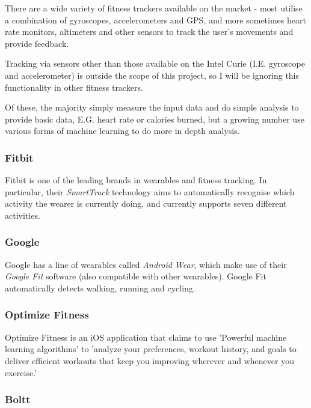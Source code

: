 \documentclass[a4paper]{article}
\begin{document}
There are a wide variety of fitness trackers available on the market - most utilise a combination of gyroscopes, accelerometers and GPS, and more sometimes heart rate monitors, altimeters and other sensors to track the user's movements and provide feedback.

Tracking via sensors other than those available on the Intel Curie (I.E. gyroscope and accelerometer) is outside the scope of this project, so I will be ignoring this functionality in other fitness trackers.

Of these, the majority simply measure the input data and do simple analysis to provide basic data, E.G. heart rate or calories burned, but a growing number use various forms of machine learning to do more in depth analysis. 

\subsubsection{Fitbit}

Fitbit is one of the leading brands in wearables and fitness tracking. In particular, their \textit{SmartTrack}\cite{bgref8} technology aims to automatically recognise which activity the wearer is currently doing, and currently supports seven different activities.

\subsubsection{Google}

Google has a line of wearables called \textit{Android Wear}\cite{bgref9}, which make use of their \textit{Google Fit}\cite{bgref10} software (also compatible with other wearables).
Google Fit automatically detects walking, running and cycling.

\subsubsection{Optimize Fitness}

Optimize Fitness\cite{bgref11} is an iOS application that claims to use 'Powerful machine learning algorithms' to 'analyze your preferences, workout history, and goals to deliver efficient workouts that keep you improving wherever and whenever you exercise.'

\subsubsection{Boltt}
\end{document}
